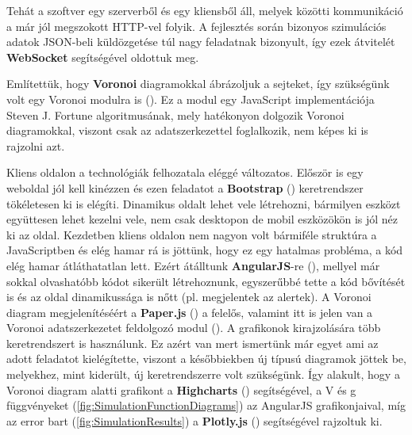 Tehát a szoftver egy szerverből és egy kliensből áll, melyek közötti kommunikáció a már jól megszokott HTTP-vel folyik. A fejlesztés során bizonyos szimulációs adatok JSON-beli küldözgetése túl nagy feladatnak bizonyult, így ezek átvitelét \textbf{WebSocket} segítségével oldottuk meg.


Említettük, hogy \textbf{Voronoi} diagramokkal ábrázoljuk a sejteket, így szükségünk volt egy Voronoi modulra is (\cite{soft:voronoiModule}). Ez a modul egy JavaScript implementációja Steven J. Fortune algoritmusának, mely hatékonyon dolgozik Voronoi diagramokkal, viszont csak az adatszerkezettel foglalkozik, nem képes ki is rajzolni azt.

Kliens oldalon a technológiák felhozatala eléggé változatos. Először is egy weboldal jól kell kinézzen és ezen feladatot a \textbf{Bootstrap} (\cite{soft:bootstrap}) keretrendszer tökéletesen ki is elégíti. Dinamikus oldalt lehet vele létrehozni, bármilyen eszközt együttesen lehet kezelni vele, nem csak desktopon de mobil eszközökön is jól néz ki az oldal. Kezdetben kliens oldalon nem nagyon volt bármiféle struktúra a JavaScriptben és elég hamar rá is jöttünk, hogy ez egy hatalmas probléma, a kód elég hamar átláthatatlan lett. Ezért átálltunk \textbf{AngularJS}-re (\cite{soft:angular}), mellyel már sokkal olvashatóbb kódot sikerült létrehoznunk, egyszerűbbé tette a kód bővítését is és az oldal dinamikussága is nőtt (pl. megjelentek az alertek). A Voronoi diagram megjelenítéséért a \textbf{Paper.js} (\cite{soft:paper}) a felelős, valamint itt is jelen van a Voronoi adatszerkezetet feldolgozó modul (\cite{soft:voronoiModule}). A grafikonok kirajzolására több keretrendszert is használunk. Ez azért van mert ismertünk már egyet ami az adott feladatot kielégítette, viszont a későbbiekben új típusú diagramok jöttek be, melyekhez, mint kiderült, új keretrendszerre volt szükségünk. Így alakult, hogy a Voronoi diagram alatti grafikont a \textbf{Highcharts} (\cite{soft:highcharts}) segítségével, a V és g függvényeket (\ref{fig:SimulationFunctionDiagrams}) az AngularJS grafikonjaival, míg az error bart (\ref{fig:SimulationResults}) a \textbf{Plotly.js} (\cite{soft:plotly}) segítségével rajzoltuk ki.

